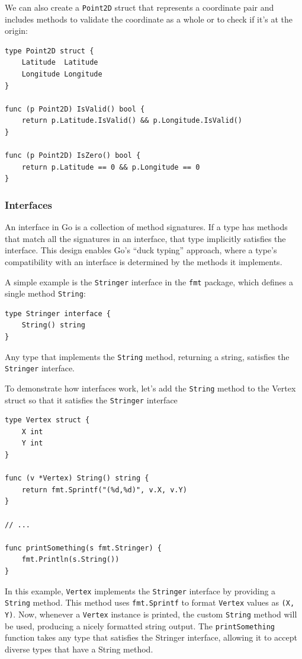 We can also create a \texttt{Point2D} struct that represents a coordinate pair and includes methods to validate the coordinate as a whole or to check if it’s at the origin:

\begin{verbatim}
type Point2D struct {
    Latitude  Latitude
    Longitude Longitude
}

func (p Point2D) IsValid() bool {
    return p.Latitude.IsValid() && p.Longitude.IsValid()
}

func (p Point2D) IsZero() bool {
    return p.Latitude == 0 && p.Longitude == 0
}
\end{verbatim}

\subsubsection{Interfaces}
An interface in Go is a collection of method signatures. If a type has methods that match all the signatures in an interface, that type implicitly satisfies the interface. This design enables Go’s “duck typing” approach, where a type’s compatibility with an interface is determined by the methods it implements.

A simple example is the \texttt{Stringer} interface in the \texttt{fmt} package, which defines a single method \texttt{String}:

\begin{verbatim}
type Stringer interface {
    String() string
}
\end{verbatim}
Any type that implements the \texttt{String} method, returning a string, satisfies the \texttt{Stringer} interface.

To demonstrate how interfaces work, let’s add the \texttt{String} method to the Vertex struct so that it satisfies the \texttt{Stringer} interface

\begin{verbatim}
type Vertex struct {
    X int
    Y int
}

func (v *Vertex) String() string {
    return fmt.Sprintf("(%d,%d)", v.X, v.Y)
}

// ...

func printSomething(s fmt.Stringer) {
    fmt.Println(s.String())
}
\end{verbatim}
In this example, \texttt{Vertex} implements the \texttt{Stringer} interface by providing a \texttt{String} method. This method uses \texttt{fmt.Sprintf} to format \texttt{Vertex} values as \texttt{(X, Y)}. Now, whenever a \texttt{Vertex} instance is printed, the custom \texttt{String} method will be used, producing a nicely formatted string output. The \texttt{printSomething} function takes any type that satisfies the Stringer interface, allowing it to accept diverse types that have a String method.

